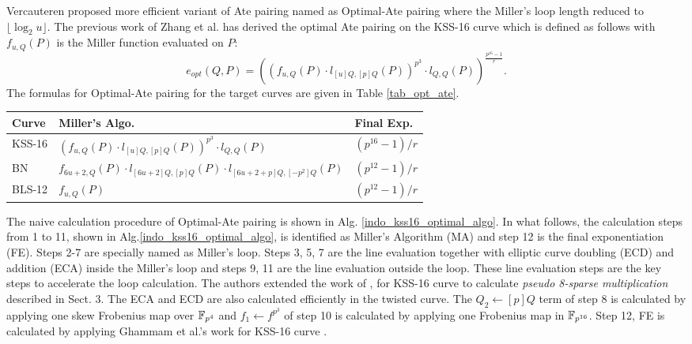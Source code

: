 Vercauteren proposed more efficient variant of Ate pairing named as Optimal-Ate pairing \cite{DBLP:journals/tit/Vercauteren10} where the Miller's loop length reduced to $\lfloor \log_2 u \rfloor$.
The previous work of Zhang et al. \cite{INDOCRYPT:ZhaLin12} has derived the optimal Ate pairing on the KSS-16 curve which is defined as follows with $f_{u,Q}(P)$ is the Miller function evaluated on $P$:
\begin{equation}
	e_{opt}(Q,P)=((f_{u,Q}(P)\cdot l_{[u]Q,[p]Q}(P))^{p^3}\cdot l_{Q,Q}(P))^{\frac{p^{16}-1}{r}}.
\end{equation}
The formulas for Optimal-Ate pairing for the target curves are given in Table \ref{tab_opt_ate}. 
\renewcommand{\baselinestretch}{1.5}
\begin{table*}[t]
\centering
\caption{Optimal-Ate pairing formulas for target curves}
\label{tab_opt_ate}
\begin{tabular}{|l|l|l|}
\hline
Curve  & Miller's Algo.                                                             & Final Exp.             \\ \hline
KSS-16 & $(f_{u,Q}(P)\cdot l_{[u]Q,[p]Q}(P))^{p^3}\cdot l_{Q,Q}(P)$                        & $(p^{16}-1)/r$ \\ \hline
BN     & $f_{6u+2,Q}(P )\cdot l_{[6u+2]Q,[p]Q} (P ) \cdot l_{[6u+2+p]Q,[-p^2]Q} (P)$ & $(p^{12}-1)/r$         \\ \hline
BLS-12 & $f_{u,Q}(P )$                                                              & $(p^{12}-1)/r$       \\ \hline
\end{tabular}
\end{table*}
\renewcommand{\baselinestretch}{1.0}

The naive calculation procedure of Optimal-Ate pairing is shown in Alg. \ref{indo_kss16_optimal_algo}.
In what follows, the calculation steps from 1 to 11, shown in Alg.\ref{indo_kss16_optimal_algo}, is identified as Miller's Algorithm (MA) and step 12 is the final exponentiation (FE).
Steps 2-7 are specially named as Miller's loop.
Steps 3, 5, 7 are the line evaluation together with elliptic curve doubling (ECD) and addition (ECA) inside the Miller's loop and steps 9, 11 are the line evaluation outside the loop.
These line evaluation steps are the key steps to accelerate the loop calculation. 
The authors extended the work of \cite{PAIRING:MANS13},\cite{ICISC:KONSD16} for KSS-16 curve to calculate \textit{pseudo 8-sparse multiplication} described in Sect. 3. The ECA and ECD are also calculated efficiently in the twisted curve. 
The $Q_2 \leftarrow [p]Q$ term of step 8 is calculated by applying one skew Frobenius map over $\mathbb{F}_{p^4}$ and $f_1\leftarrow f^{p^3}$ of step 10 is calculated by applying one Frobenius map in $\mathbb{F}_{p^{16}}$. 
Step 12, FE is calculated by applying Ghammam et al.'s work for KSS-16 curve \cite{EPRINT:GhaFou16b}.

